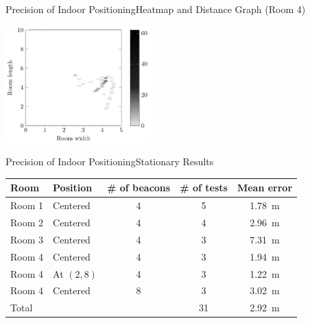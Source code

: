 \begin{frame}{Precision of Indoor Positioning}{Heatmap and Distance Graph (Room 4)}
	\centering\vfill
	  \begin{minipage}[b]{0.49\textwidth}
	  	\centering
	  	\includegraphics[width=\textwidth, height=4.5cm]{../data/estimote-test-results/heatmaps/pdf/36}
			\vspace{0.35cm}
	  \end{minipage}\hfill
	  \begin{minipage}[b]{0.49\textwidth}
	  	\centering      
	  \end{minipage}
\end{frame}

\begin{frame}{Precision of Indoor Positioning}{Stationary Results}
  \centering\vfill
  \begin{tabular}{l|l c c c}
  	Room   & Position   & \# of beacons & \# of tests & Mean error        \\ \hline
  	Room 1 & Centered   & \num{4}       & 5           & \SI{1.78}{\meter} \\
  	Room 2 & Centered   & \num{4}       & 4           & \SI{2.96}{\meter} \\
  	Room 3 & Centered   & \num{4}       & 3           & \SI{7.31}{\meter} \\
  	Room 4 & Centered   & \num{4}       & 3           & \SI{1.94}{\meter} \\
  	Room 4 & At $(2,8)$ & \num{4}       & 3           & \SI{1.22}{\meter} \\
  	Room 4 & Centered   & \num{8}       & 3           & \SI{3.02}{\meter} \\ \hline
  	Total  &            &               & 31          & \SI{2.92}{\meter}
  \end{tabular}
\end{frame}


